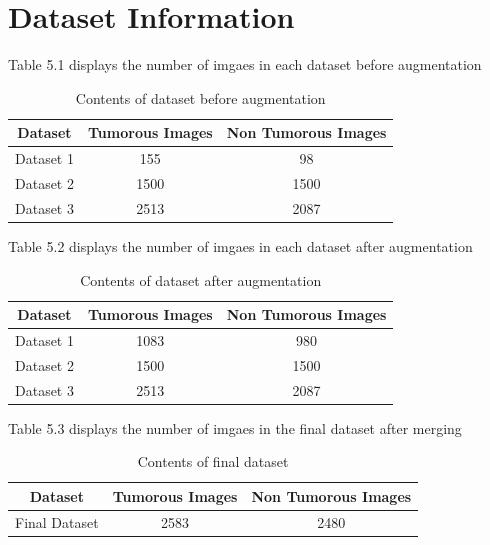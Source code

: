\section{Dataset Information}
Table 5.1 displays the number of imgaes in each dataset before augmentation\\
\begin{table}[h!]
\caption{Contents of dataset before augmentation}
\label{tab:table1}
\begin{tabular}{|c|c|c|}
\hline
\rowcolor[HTML]{CBCEFB} 
\textbf{Dataset} & \textbf{Tumorous Images} & \textbf{Non Tumorous Images} \\ \hline
Dataset 1        & 155                      & 98                           \\ \hline
Dataset 2        & 1500                     & 1500                         \\ \hline
Dataset 3        & 2513                     & 2087                         \\ \hline
\end{tabular}
\end{table}

Table 5.2 displays the number of imgaes in each dataset after augmentation\\
\begin{table}[h!]
\caption{Contents of dataset after augmentation}
\label{tab:table1}
\begin{tabular}{|c|c|c|}
\hline
\rowcolor[HTML]{CBCEFB} 
\textbf{Dataset} & \textbf{Tumorous Images} & \textbf{Non Tumorous Images} \\ \hline
Dataset 1        & 1083                      & 980                           \\ \hline
Dataset 2        & 1500                     & 1500                         \\ \hline
Dataset 3        & 2513                     & 2087                         \\ \hline
\end{tabular}
\end{table}

Table 5.3 displays the number of imgaes in the final dataset after merging\\
\begin{table}[h!]
\caption{Contents of final dataset}
\label{tab:table1}
\begin{tabular}{|c|c|c|}
\hline
\rowcolor[HTML]{CBCEFB} 
\textbf{Dataset} & \textbf{Tumorous Images} & \textbf{Non Tumorous Images} \\ \hline
Final Dataset    & 2583                     & 2480                         \\ \hline
\end{tabular}
\end{table}

